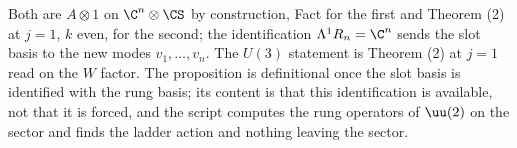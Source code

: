 Both are $A \otimes 1$ on $\C^{n} \otimes \CS$ by construction, Fact  for the first and Theorem (2) at $j = 1$, $k$ even, for the second; the identification $\Lambda^{1}R_{n} = \C^{n}$ sends the slot basis to the new modes $v_{1}, \ldots, v_{n}$. The $U(3)$ statement is Theorem (2) at $j = 1$ read on the $W$ factor. The proposition is definitional once the slot basis is identified with the rung basis; its content is that this identification is available, not that it is forced, and the script computes the rung operators of $\uu(2)$ on the sector and finds the ladder action and nothing leaving the sector.
